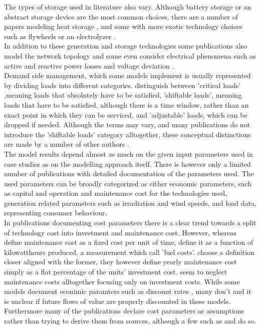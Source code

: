 \documentclass[
	11pt,								%
	DIV10,								%
	a4paper,         					%
	oneside,							%
	headheight=20pt,					%
	footheight=20pt,					%
    parskip=full,						%
    listof=totoc,						%
	bibliography=totoc,					%
	index=totoc,						%
]{scrartcl}
\begin{document}
The types of storage used in literature also vary. Although battery storage \cite{7399422}\cite{UMEOZOR2016272}\cite{6465822} or an abstract storage device \cite{6669807}\cite{zhang2011optimal} are the most common choices, there are a number of papers modeling heat storage \cite{zhang2013efficient}\cite{zhang2015optimal}\cite{LAUINGER201624}\cite{wouters2015energy}, and some with more exotic technology choices such as flywheels \cite{6700453} or an electrolyzer \cite{7125149}.
\\
In addition to these generation and storage technologies some publications also model the network topology \cite{8023785}\cite{7972908}\cite{SHAMS2018326} and some even consider electrical phenomena such as active and reactive power losses \cite{7741704}\cite{mashayekhMixedIntegerLinear2017} and voltage deviation \cite{7741704}. 
\\
Demand side management, which some models implement is usually represented by dividing loads into different categories. \cite{7972908} distinguish between 'critical loads' ,meaning loads that absolutely have to be satisfied, 'shiftable loads', meaning loads that have to be satisfied, although there is a time window, rather than an exact point in which they can be serviced, and 'adjustable' loads, which can be dropped if needed. Although the terms may vary, and many publications do not introduce the 'shiftable loads' category alltogether, these conceptual distinctions are made by a number of other authors \cite{silvente2015rolling}\cite{zhang2015optimal}\cite{8216436}.
\\
The model results depend almost as much on the given input parameters used in case studies as on the modelling approach itself. There is however only a limited number of publications with detailed documentation of the parameters used.
The used parameters can be broadly categorized as either economic parameters, such as capital and operation and maintenance cost for the technologies used, generation related parameters such as irradiation and wind speeds, and load data, representing consumer behaviour.
\\
In publications documenting cost parameters there is a clear trend towards a split of technology cost into investment and maintenance cost. However, whereas \cite{LAUINGER201624} define maintenance cost as a fixed cost per unit of time, \cite{wouters2015energy} define it as a function of kilowatthours produced, a measurement which \cite{LAUINGER201624} call 'fuel costs'. \cite{7399422} choose a definition closer aligned with the former, they however define yearly maintenance cost simply as a flat percentage of the units' investment cost.\cite{KOLTSAKLIS2018318} seem to neglect maintenance costs alltogether focusing only on investment costs. While some models document econimic paramters such as discount rates \cite{7399422}, many don't and it is unclear if future flows of value are properly discounted in these models. Furthermore many of the publications declare cost parameters as assumptions rather than trying to derive them from sources, although a few such as \cite{LAUINGER201624} and \cite{wouters2015energy} do so.
\end{document}
